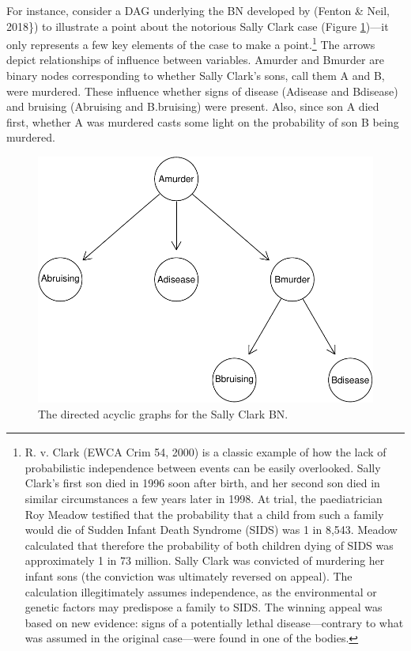\documentclass[
  10pt,
]{scrartcl}
\begin{document}
For instance, consider a DAG underlying the BN developed by (Fenton \& Neil, 2018\}) to illustrate a point about the notorious Sally Clark case (Figure \ref{fig:sc})---it only represents a few key elements of the case to make a point.\footnote{ R. v. Clark (EWCA Crim 54, 2000) is a classic example of how the lack of probabilistic independence between events can be easily overlooked. Sally Clark's first son died in 1996 soon after birth, and her second son died in similar circumstances a few years later in 1998. At trial, the paediatrician Roy Meadow testified that the probability that a child from such a family would die of Sudden Infant Death Syndrome (SIDS) was 1 in 8,543. Meadow calculated that therefore the probability of both children dying of SIDS was approximately 1 in 73 million. Sally Clark was convicted of murdering her infant sons (the conviction was ultimately reversed on appeal). The calculation illegitimately assumes independence, as the environmental or genetic factors may predispose a family to SIDS. The winning appeal was based on new evidence: signs of a potentially lethal disease---contrary to what was assumed in the original case---were found in one of the bodies.} The arrows depict relationships of influence between variables. \textsf{Amurder} and \textsf{Bmurder} are binary nodes corresponding to whether Sally Clark's sons, call them A and B, were murdered. These influence whether signs of disease (\textsf{Adisease} and \textsf{Bdisease}) and bruising (\textsf{Abruising} and \textsf{B.bruising}) were present. Also, since son A died first, whether A was murdered casts some light on the probability of son B being murdered.

\begin{figure}

\begin{center}\includegraphics[width=0.8\linewidth]{coherencePaper40_files/figure-latex/scDAG-1} \end{center}
\caption{The directed acyclic graphs for the Sally Clark BN. }
\label{fig:sc}
\end{figure}
\end{document}
